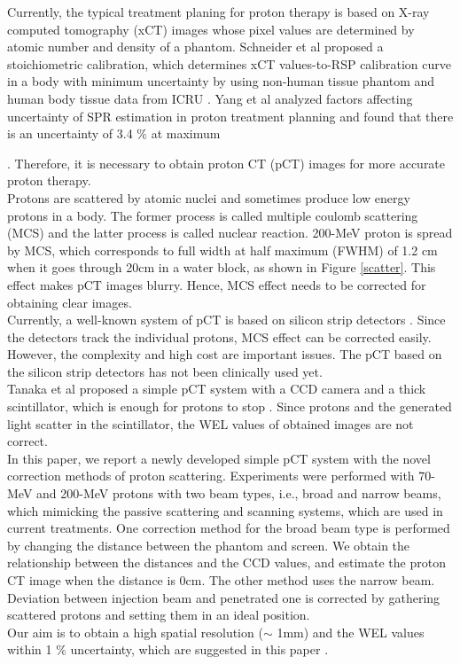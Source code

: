 \documentclass[preprint,3pt]{elsarticle} %
\begin{document}
Currently, the typical treatment planing for proton therapy is based on X-ray computed tomography (xCT) images whose pixel values are determined by atomic number and density of a phantom. Schneider et al proposed a stoichiometric calibration, which determines xCT values-to-RSP calibration curve in a body with minimum uncertainty by using non-human tissue phantom and human body tissue data from ICRU {\cite{schneider}}. Yang et al analyzed factors affecting uncertainty of SPR estimation in proton treatment planning and found that there is an uncertainty of 3.4 $\%$ at maximum {\cite{Yang}. Therefore, it is necessary to obtain proton CT (pCT) images for more accurate proton therapy.\\
	Protons are scattered by atomic nuclei and sometimes produce low energy protons in a body. The former process is called multiple coulomb scattering (MCS) and the latter process is called nuclear reaction. 200-MeV proton is spread by MCS, which corresponds to full width at half maximum (FWHM) of 1.2 cm when it goes through 20cm in a water block, as shown in Figure \ref{scatter}. This effect makes pCT images blurry. Hence, MCS effect needs to be corrected for obtaining clear images.\\
	Currently, a well-known system of pCT is based on silicon strip detectors {\cite{SSD}}. Since the detectors track the individual protons, MCS effect can be corrected easily. However, the complexity and high cost are important issues. The pCT based on the silicon strip detectors has not been clinically used yet.\\
	Tanaka et al proposed a simple pCT system with a CCD camera and a thick scintillator, which is enough for protons to stop {\cite{mrtanaka}}. Since protons and the generated light scatter in the scintillator, the WEL values of obtained images are not correct.\\
	In this paper, we report a newly developed simple pCT system with the novel correction methods of proton scattering. Experiments were performed with 70-MeV and 200-MeV protons with two beam types, i.e., broad and narrow beams, which mimicking the passive scattering and scanning systems, which are used in current treatments. One correction method for the broad beam type is performed by changing the distance between the phantom and screen. We obtain the relationship between the distances and the CCD values, and estimate the proton CT image when the distance is 0cm. The other method uses the narrow beam. Deviation between injection beam and penetrated one is corrected by gathering scattered protons and setting them in an ideal position.\\
Our aim is to obtain a high spatial resolution ($\sim$ 1mm) and the WEL values within 1 $\%$ uncertainty, which are suggested in this paper {\cite{POLUDNIOWSKI}}.

}
\end{document}
